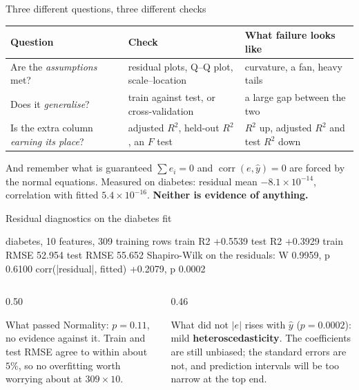 \documentclass[aspectratio=169]{beamer}
\begin{document}
\begin{frame}[shrink=6]{Three different questions, three different checks}
  \begin{center}\small
  \begin{tabular}{@{}p{3.6cm}p{4.2cm}p{4.2cm}@{}}
    \toprule
    \textbf{Question} & \textbf{Check} & \textbf{What failure looks like}\\
    \midrule
    Are the \emph{assumptions} met? &
      residual plots, Q--Q plot, scale--location &
      curvature, a fan, heavy tails\\[4pt]
    Does it \emph{generalise}? &
      train against test, or cross-validation &
      a large gap between the two\\[4pt]
    Is the extra column \emph{earning its place}? &
      adjusted $R^2$, held-out $R^2$, an $F$ test &
      $R^2$ up, adjusted $R^2$ and test $R^2$ down\\
    \bottomrule
  \end{tabular}
  \end{center}
  \vspace{0.3em}
  \begin{alertblock}{And remember what is guaranteed}
    \small $\sum e_i = 0$ and $\operatorname{corr}(e, \hat y) = 0$ are forced
    by the normal equations. Measured on diabetes: residual mean
    $-8.1\times10^{-14}$, correlation with fitted $5.4\times10^{-16}$.
    \textbf{Neither is evidence of anything.}
  \end{alertblock}
\end{frame}

\begin{frame}[fragile,shrink=8]{Residual diagnostics on the diabetes fit}
\begin{outblk}
diabetes, 10 features, 309 training rows
   train R2 +0.5539   test R2 +0.3929
   train RMSE 52.954  test RMSE 55.652
   Shapiro-Wilk on the residuals: W 0.9959, p 0.6100
   corr(|residual|, fitted) +0.2079, p 0.0002
\end{outblk}
\begin{columns}[T]
  \begin{column}{0.50\textwidth}
    \begin{block}{What passed}
      \small Normality: $p = 0.11$, no evidence against it. Train and test
      RMSE agree to within about $5\%$, so no overfitting worth worrying
      about at $309 \times 10$.
    \end{block}
  \end{column}
  \begin{column}{0.46\textwidth}
    \begin{alertblock}{What did not}
      \small $|e|$ rises with $\hat y$ ($p = 0.0002$): mild
      \textbf{heteroscedasticity}. The coefficients are still unbiased; the
      standard errors are not, and prediction intervals will be too narrow
      at the top end.
    \end{alertblock}
  \end{column}
\end{columns}
\end{frame}
\end{document}
